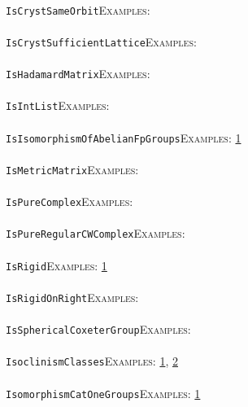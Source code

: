 \documentclass[a4paper,11pt]{report}
\begin{document}
{{ \\
 \texttt{IsCrystSameOrbit}{\nobreakspace}{\nobreakspace}{\nobreakspace}{\nobreakspace}\textsc{Examples:} \\
 \\
 \texttt{IsCrystSufficientLattice}{\nobreakspace}{\nobreakspace}{\nobreakspace}{\nobreakspace}\textsc{Examples:} \\
 \\
 \texttt{IsHadamardMatrix}{\nobreakspace}{\nobreakspace}{\nobreakspace}{\nobreakspace}\textsc{Examples:} \\
 \\
 \texttt{IsIntList}{\nobreakspace}{\nobreakspace}{\nobreakspace}{\nobreakspace}\textsc{Examples:} \\
 \\
 \texttt{IsIsomorphismOfAbelianFpGroups}{\nobreakspace}{\nobreakspace}{\nobreakspace}{\nobreakspace}\textsc{Examples:} \href{tutorial/chap1.html} {1}{\nobreakspace} \\
 \\
 \texttt{IsMetricMatrix}{\nobreakspace}{\nobreakspace}{\nobreakspace}{\nobreakspace}\textsc{Examples:} \\
 \\
 \texttt{IsPureComplex}{\nobreakspace}{\nobreakspace}{\nobreakspace}{\nobreakspace}\textsc{Examples:} \\
 \\
 \texttt{IsPureRegularCWComplex}{\nobreakspace}{\nobreakspace}{\nobreakspace}{\nobreakspace}\textsc{Examples:} \\
 \\
 \texttt{IsRigid}{\nobreakspace}{\nobreakspace}{\nobreakspace}{\nobreakspace}\textsc{Examples:} \href{tutorial/chap8.html} {1}{\nobreakspace} \\
 \\
 \texttt{IsRigidOnRight}{\nobreakspace}{\nobreakspace}{\nobreakspace}{\nobreakspace}\textsc{Examples:} \\
 \\
 \texttt{IsSphericalCoxeterGroup}{\nobreakspace}{\nobreakspace}{\nobreakspace}{\nobreakspace}\textsc{Examples:} \\
 \\
 \texttt{IsoclinismClasses}{\nobreakspace}{\nobreakspace}{\nobreakspace}{\nobreakspace}\textsc{Examples:} \href{tutorial/chap5.html} {1}{\nobreakspace}, \href{../www/SideLinks/About/aboutBogomolov.html} {2}{\nobreakspace} \\
 \\
 \texttt{IsomorphismCatOneGroups}{\nobreakspace}{\nobreakspace}{\nobreakspace}{\nobreakspace}\textsc{Examples:} \href{../www/SideLinks/About/aboutquasi.html} {1}{\nobreakspace} \\
}}
\end{document}
